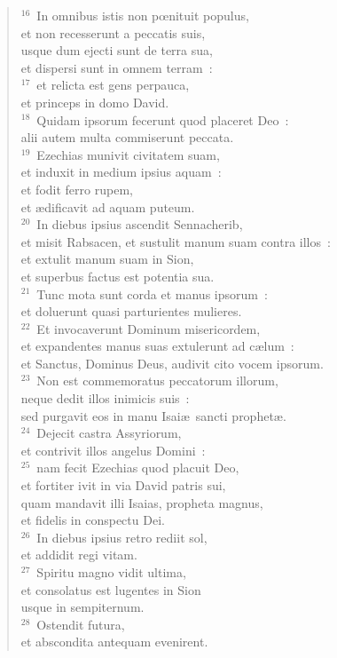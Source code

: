 \begin{verse}${}^{16}$~In omnibus istis non pœnituit populus,\\ et non recesserunt a peccatis suis,\\ usque dum ejecti sunt de terra sua,\\ et dispersi sunt in omnem terram~:\\
${}^{17}$~et relicta est gens perpauca,\\ et princeps in domo David.\\
${}^{18}$~Quidam ipsorum fecerunt quod placeret Deo~:\\ alii autem multa commiserunt peccata.\\
${}^{19}$~Ezechias munivit civitatem suam,\\ et induxit in medium ipsius aquam~:\\ et fodit ferro rupem,\\ et \ae dificavit ad aquam puteum.\\
${}^{20}$~In diebus ipsius ascendit Sennacherib,\\ et misit Rabsacen, et sustulit manum suam contra illos~:\\ et extulit manum suam in Sion,\\ et superbus factus est potentia sua.\\
${}^{21}$~Tunc mota sunt corda et manus ipsorum~:\\ et doluerunt quasi parturientes mulieres.\\
${}^{22}$~Et invocaverunt Dominum misericordem,\\ et expandentes manus suas extulerunt ad c\ae lum~:\\ et Sanctus, Dominus Deus, audivit cito vocem ipsorum.\\
${}^{23}$~Non est commemoratus peccatorum illorum,\\ neque dedit illos inimicis suis~:\\ sed purgavit eos in manu Isai\ae\ sancti prophet\ae .\\
${}^{24}$~Dejecit castra Assyriorum,\\ et contrivit illos angelus Domini~:\\
${}^{25}$~nam fecit Ezechias quod placuit Deo,\\ et fortiter ivit in via David patris sui,\\ quam mandavit illi Isaias, propheta magnus,\\ et fidelis in conspectu Dei.\\
${}^{26}$~In diebus ipsius retro rediit sol,\\ et addidit regi vitam.\\
${}^{27}$~Spiritu magno vidit ultima,\\ et consolatus est lugentes in Sion\\ usque in sempiternum.\\
${}^{28}$~Ostendit futura,\\ et abscondita antequam evenirent.\end{verse}


